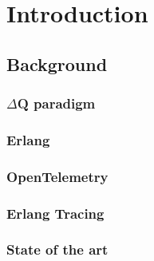 \chapter{Introduction}
    \section{Background}
        \subsection{$\Delta$Q paradigm}
        \subsection{Erlang}
        \subsection{OpenTelemetry}
        \subsection{Erlang Tracing}
        \subsection{State of the art}
